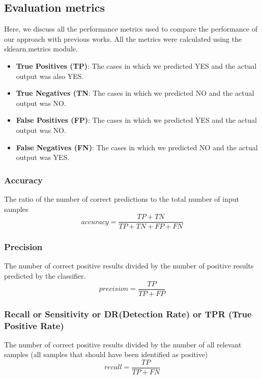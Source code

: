 \documentclass[14pt, conference]{IEEEtran}
\begin{document}
\subsection{Evaluation metrics}
Here, we discuss all the performance metrics used to compare the performance of our approach with previous works.
All the metrics were calculated using the sklearn.metrics module.
\begin{itemize}
    \item \textbf{True Positives (TP)}: The cases in which we predicted YES and the actual output was also YES.
    \item \textbf{True Negatives (TN}: The cases in which we predicted NO and the actual output was NO.
    \item \textbf{False Positives (FP)}: The cases in which we predicted YES and the actual output was NO.
    \item \textbf{False Negatives (FN)}: The cases in which we predicted NO and the actual output was YES.
\end{itemize}

\subsubsection{Accuracy}
The ratio of the number of correct predictions to the total number of input samples
\begin{equation}
    accuracy = \frac{TP+TN}{TP+TN+FP+FN}
\end{equation}

\subsubsection{Precision}
The number of correct positive results divided by the number of positive results predicted by the classifier.
\begin{equation}
    precision = \frac{TP}{TP+FP}
\end{equation}

\subsubsection{Recall or Sensitivity or DR(Detection Rate) or TPR (True Positive Rate)}
The number of correct positive results divided by the number of all relevant samples (all samples that should
have been identified as positive)
\begin{equation}
    recall = \frac{TP}{TP+FN}
\end{equation}
\end{document}
